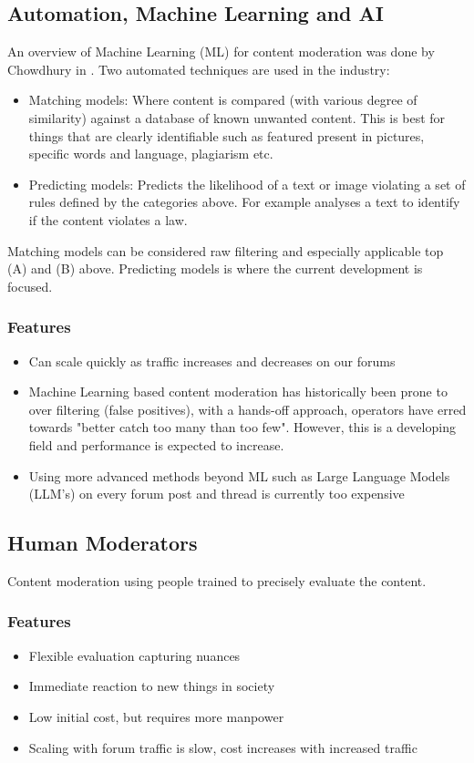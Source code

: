 \documentclass[
	letterpaper, %
	12pt, %
	unnumberedsections, %
	twoside, %
]{LTJournalArticle}
\begin{document}
\subsection{Automation, Machine Learning and AI}
An overview of Machine Learning (ML) for content moderation was done by Chowdhury in \cite{StanfordPrimer}. Two automated techniques are used in the industry:
\begin{itemize}
	\item Matching models: Where content is compared (with various degree of similarity) against a database of known unwanted content. This is best for things that are clearly identifiable such as featured present in pictures, specific words and language, plagiarism etc.
	\item Predicting models: Predicts the likelihood of a text or image violating a set of rules defined by the categories above. For example analyses a text to identify if the content violates a law.
\end{itemize}

Matching models can be considered raw filtering and especially applicable top (A) and (B) above. Predicting models is where the current development is focused.

\subsubsection*{Features}
\begin{itemize}
	\item Can scale quickly as traffic increases and decreases on our forums
	\item Machine Learning based content moderation has historically been prone to over filtering (false positives), with a hands-off approach, operators have erred towards "better catch too many than too few". However, this is a developing field and performance is expected to increase.
	\item Using more advanced methods beyond ML such as Large Language Models (LLM's) on every forum post and thread is currently too expensive
\end{itemize}

\subsection{Human Moderators}
Content moderation using people trained to precisely evaluate the content.
\subsubsection*{Features}
\begin{itemize}
	\item Flexible evaluation capturing nuances
	\item Immediate reaction to new things in society
	\item Low initial cost, but requires more manpower
	\item Scaling with forum traffic is slow, cost increases with increased traffic
\end{itemize}
\end{document}
